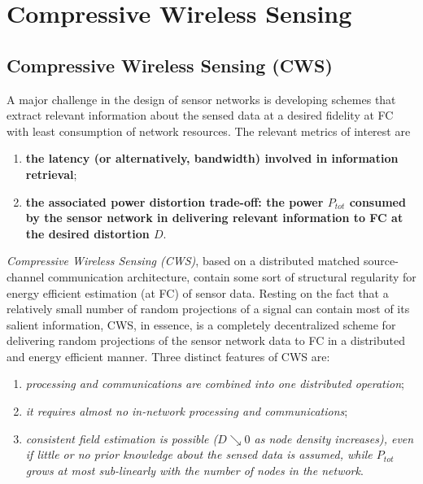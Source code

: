 \chapter{Compressive Wireless Sensing}
\label{CWS}

\section{Compressive Wireless Sensing (CWS)}
A major challenge in the design of sensor networks is developing \textcolor[rgb]{0,0,1}{schemes that extract relevant information about the sensed data} at a desired fidelity at FC with \textcolor[rgb]{0,0,1}{least consumption of network resources}. The relevant metrics of interest are
\begin{enumerate}
    \item \textbf{\textcolor[rgb]{0,0,1}{the latency (or alternatively, bandwidth) involved in information retrieval}};
    \item \textbf{\textcolor[rgb]{0,0,1}{the associated power distortion trade-off: the power $P_{tot}$ consumed by the sensor network in delivering relevant information to FC at the desired distortion $D$}}.
\end{enumerate}

\emph{\textcolor[rgb]{0,0,1}{Compressive Wireless Sensing (CWS)}}, based on a distributed matched source-channel communication architecture, contain some sort of structural regularity for energy efficient estimation (at FC) of sensor data. Resting on the fact that a relatively small number of random projections of a signal can contain most of its salient information, CWS, in essence, is a completely decentralized scheme for delivering random projections of the sensor network data to FC in a distributed and energy efficient manner. Three distinct features of CWS are:
\begin{enumerate}
    \item \emph{\textcolor[rgb]{0,0,1}{processing and communications are combined into one distributed operation}};
    \item \emph{\textcolor[rgb]{0,0,1}{it requires almost no in-network processing and communications}};
    \item \emph{\textcolor[rgb]{0,0,1}{consistent field estimation is possible ($D\searrow0$ as node density increases), even if little or no prior knowledge about the sensed data is assumed, while $P_{tot}$ grows at most sub-linearly with the number of nodes in the network}}.
\end{enumerate}

